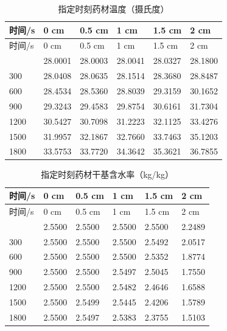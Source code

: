 \begin{longtable}{P{0.1}P{0.14}P{0.14}P{0.14}P{0.14}P{0.14}}
\caption{指定时刻药材温度（摄氏度）}\label{tab:temperature}\\
\toprule 时间/s & 0 cm & 0.5 cm & 1 cm & 1.5 cm & 2 cm\\
\midrule\endfirsthead
\toprule 时间/s & 0 cm & 0.5 cm & 1 cm & 1.5 cm & 2 cm\\
\midrule\endhead
\bottomrule{} & 28.0001 & 28.0003 & 28.0041 & 28.0327 & 28.1800\\
300 & 28.0408 & 28.0635 & 28.1514 & 28.3680 & 28.8487\\
600 & 28.4534 & 28.5360 & 28.8039 & 29.3159 & 30.1652\\
900 & 29.3243 & 29.4583 & 29.8754 & 30.6161 & 31.7304\\
1200 & 30.5427 & 30.7098 & 31.2223 & 32.1125 & 33.4276\\
1500 & 31.9957 & 32.1867 & 32.7660 & 33.7463 & 35.1203\\
1800 & 33.5753 & 33.7720 & 34.3642 & 35.3621 & 36.7855\\
\end{longtable}
\begin{longtable}{P{0.1}P{0.14}P{0.14}P{0.14}P{0.14}P{0.14}}
\caption{指定时刻药材干基含水率（kg/kg）}\label{tab:moisture}\\
\toprule 时间/s & 0 cm & 0.5 cm & 1 cm & 1.5 cm & 2 cm\\
\midrule\endfirsthead
\toprule 时间/s & 0 cm & 0.5 cm & 1 cm & 1.5 cm & 2 cm\\
\midrule\endhead
\bottomrule{} & 2.5500 & 2.5500 & 2.5500 & 2.5500 & 2.2489\\
300 & 2.5500 & 2.5500 & 2.5500 & 2.5492 & 2.0517\\
600 & 2.5500 & 2.5500 & 2.5500 & 2.5352 & 1.8774\\
900 & 2.5500 & 2.5500 & 2.5497 & 2.5045 & 1.7550\\
1200 & 2.5500 & 2.5500 & 2.5482 & 2.4646 & 1.6588\\
1500 & 2.5500 & 2.5499 & 2.5445 & 2.4206 & 1.5789\\
1800 & 2.5500 & 2.5497 & 2.5383 & 2.3755 & 1.5103\\
\end{longtable}

